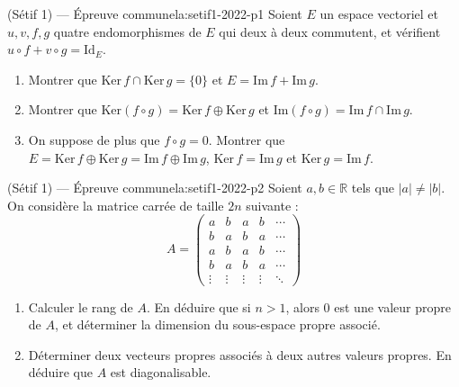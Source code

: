\begin{problem}{(Sétif 1) — Épreuve commune}{la:setif1-2022-p1}
Soient $E$ un espace vectoriel et $u, v, f, g$ quatre endomorphismes de $E$ qui
deux à deux commutent, et vérifient $u \circ f + v \circ g = \mathrm{Id}_E$.
\begin{enumerate}
\item Montrer que $\mathrm{Ker}\,f \cap \mathrm{Ker}\,g = \{0\}$ et
      $E = \mathrm{Im}\,f + \mathrm{Im}\,g$.
\item Montrer que
      $\mathrm{Ker}(f \circ g) = \mathrm{Ker}\,f \oplus \mathrm{Ker}\,g$ et
      $\mathrm{Im}(f \circ g) = \mathrm{Im}\,f \cap \mathrm{Im}\,g$.
\item On suppose de plus que $f \circ g = 0$. Montrer que
      $E = \mathrm{Ker}\,f \oplus \mathrm{Ker}\,g = \mathrm{Im}\,f \oplus \mathrm{Im}\,g$,
      $\mathrm{Ker}\,f = \mathrm{Im}\,g$ et $\mathrm{Ker}\,g = \mathrm{Im}\,f$.
\end{enumerate}

\end{problem}

\newpage

\begin{problem}{(Sétif 1) — Épreuve commune}{la:setif1-2022-p2}
Soient $a, b \in \mathbb{R}$ tels que $|a| \neq |b|$. On considère la matrice carrée
de taille $2n$ suivante :
$$
A = \begin{pmatrix}
a & b & a & b & \cdots \\
b & a & b & a & \cdots \\
a & b & a & b & \cdots \\
b & a & b & a & \cdots \\
\vdots & \vdots & \vdots & \vdots & \ddots
\end{pmatrix}
$$
\begin{enumerate}
\item Calculer le rang de $A$. En déduire que si $n > 1$, alors $0$ est une valeur
      propre de $A$, et déterminer la dimension du sous-espace propre associé.
\item Déterminer deux vecteurs propres associés à deux autres valeurs propres. En
      déduire que $A$ est diagonalisable.
\end{enumerate}

\end{problem}

